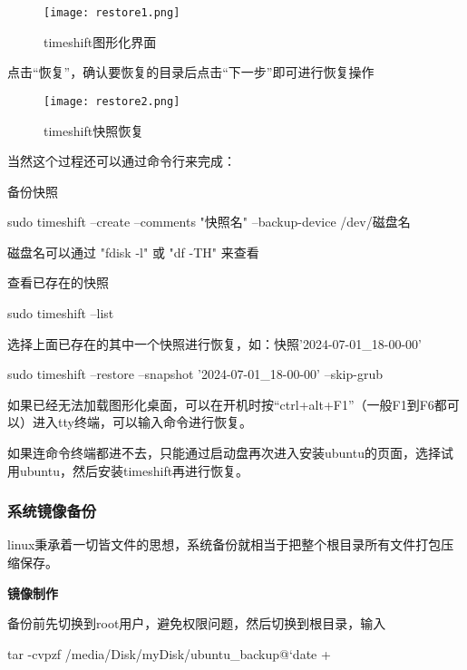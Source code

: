 \begin{figure}[H]
    \centering
    \texttt{[image: restore1.png]}
    \caption{timeshift图形化界面} %
    \label{fig:restore1} %
\end{figure}

点击“恢复”，确认要恢复的目录后点击“下一步”即可进行恢复操作

\begin{figure}[H]
    \centering
    \texttt{[image: restore2.png]}
    \caption{timeshift快照恢复} %
    \label{fig:restore2} %
\end{figure}

当然这个过程还可以通过命令行来完成：

备份快照

\begin{tcode}
	sudo timeshift --create --comments "快照名" --backup-device /dev/磁盘名
\end{tcode}

磁盘名可以通过 "fdisk -l" 或 "df -TH" 来查看

查看已存在的快照

\begin{tcode}
	sudo timeshift --list
\end{tcode}

选择上面已存在的其中一个快照进行恢复，如：快照'2024-07-01\_18-00-00'

\begin{tcode}
	sudo timeshift --restore --snapshot '2024-07-01_18-00-00' --skip-grub
\end{tcode}

如果已经无法加载图形化桌面，可以在开机时按“ctrl+alt+F1”（一般F1到F6都可以）进入tty终端，可以输入命令进行恢复。

如果连命令终端都进不去，只能通过启动盘再次进入安装ubuntu的页面，选择试用ubuntu，然后安装timeshift再进行恢复。

\subsubsection{系统镜像备份}

linux秉承着一切皆文件的思想，系统备份就相当于把整个根目录所有文件打包压缩保存。

\textbf{镜像制作}

备份前先切换到root用户，避免权限问题，然后切换到根目录，输入

\begin{tcode}
	tar -cvpzf /media/Disk/myDisk/ubuntu_backup@`date +%
\end{tcode}

